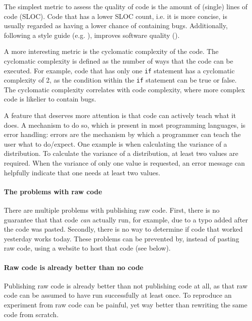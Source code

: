The simplest metric to assess the quality of code is 
the amount of (single) lines of code (SLOC). 
Code that has a lower SLOC count, i.e. it is more concise,
is usually regarded as having a lower chance of containing bugs.
Additionally, following a style guide (e.g. \cite{style_guide}), 
improves software quality (\cite{fang2001}).

A more interesting metric is the cyclomatic complexity of the code.
The cyclomatic complexity is defined as the number of ways that
the code can be executed. 
For example, code that has only one \verb|if| statement
has a cyclomatic complexity of 2, as the condition within the \verb|if|
statement can be true or false.
The cyclomatic complexity correlates with code complexity,
where more complex code is likelier to contain bugs.

A feature that deserves more attention
is that code can actively teach what it does.
A mechanism to do so, which is present in most programming
languages, is error handling: errors are the mechanism
by which a programmer can teach the user what to do/expect.
One example is when calculating the variance of a distribution.
To calculate the variance of a distribution, at least two values
are required. When the variance of only one value is requested,
an error message can helpfully indicate that one needs at least two values.

\paragraph{The problems with raw code}

There are multiple problems with publishing raw code.
First, there is no guarantee that that code \emph{can} actually
run, for example, due to a typo added after the code was pasted.
Secondly, there is no way to determine if code that worked yesterday
works today. These problems can be prevented by, instead of
pasting raw code, using a website to host that code (see below).

\paragraph{Raw code is already better than no code}

Publishing raw code is already better than not publishing code at all,
as that raw code can be assumed to have run successfully at least once.
To reproduce an experiment from raw code can be painful, 
yet way better than rewriting the same code from scratch.

